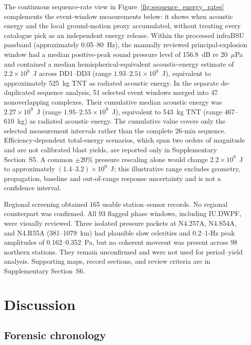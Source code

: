 \documentclass[]{seismica}
\begin{document}
The continuous sequence-rate view in
Figure~\ref{fig:sequence_energy_rates} complements the event-window
measurements below: it shows when acoustic energy and the local ground-motion
proxy accumulated, without treating every catalogue pick as an independent
energy release. Within the processed infraBSU passband (approximately
0.05--80~Hz), the manually reviewed principal-explosion window had a median positive-peak sound
pressure level of 156.8~dB re 20~$\mu$Pa and contained a median
hemispherical-equivalent acoustic-energy estimate of $2.2\times10^9$~J across DD1--DD3
(range $1.93$--$2.51\times10^9$~J), equivalent to approximately 525~kg TNT as
radiated acoustic energy. In the separate de-duplicated sequence analysis,
51 selected event windows merged into 47 nonoverlapping complexes. Their
cumulative median acoustic energy was $2.27\times10^9$~J
(range $1.95$--$2.55\times10^9$~J), equivalent to 543~kg TNT
(range 467--610~kg) as radiated acoustic energy. The cumulative value covers
only the selected measurement intervals rather than the complete 26-min
sequence. Efficiency-dependent total-energy scenarios, which span two orders
of magnitude and are not calibrated blast yields, are reported only in
Supplementary Section~S5. A common $\pm20\%$ pressure rescaling alone would
change $2.2\times10^9$~J to approximately $(1.4\text{--}3.2)\times10^9$~J;
this illustrative range excludes geometry, propagation, baseline and
out-of-range response uncertainty and is not a confidence interval.

Regional screening obtained 165 usable station--sensor records. No regional
counterpart was confirmed. All 93 flagged phase windows, including IU.DWPF,
were visually reviewed. Three isolated pressure packets at N4.257A, N4.S54A,
and N4.R55A (381--1079~km) had plausible slow celerities and 0.2--1-Hz peak
amplitudes of 0.162--0.352~Pa, but no coherent moveout was present across 98
northern stations. They remain unconfirmed and were not used for period--yield
analysis. Supporting maps, record sections, and review criteria are in
Supplementary Section~S6.

\FloatBarrier

\section{Discussion}
\label{sec:discussion}

\subsection{Forensic chronology}
\end{document}
